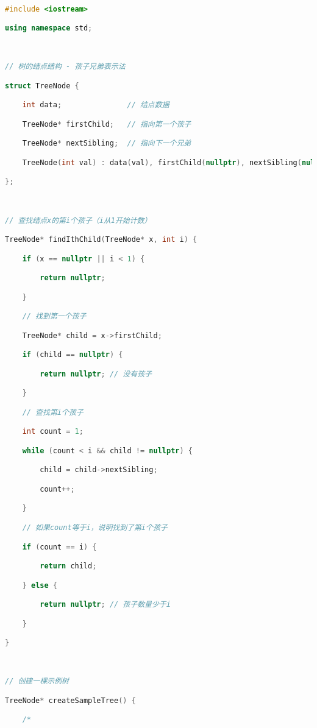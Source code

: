 \begin{lstlisting}[language=C++]

#include <iostream>

using namespace std;

  

// 树的结点结构 - 孩子兄弟表示法

struct TreeNode {

    int data;               // 结点数据

    TreeNode* firstChild;   // 指向第一个孩子

    TreeNode* nextSibling;  // 指向下一个兄弟

    TreeNode(int val) : data(val), firstChild(nullptr), nextSibling(nullptr) {}

};

  

// 查找结点x的第i个孩子（i从1开始计数）

TreeNode* findIthChild(TreeNode* x, int i) {

    if (x == nullptr || i < 1) {

        return nullptr;

    }

    // 找到第一个孩子

    TreeNode* child = x->firstChild;

    if (child == nullptr) {

        return nullptr; // 没有孩子

    }

    // 查找第i个孩子

    int count = 1;

    while (count < i && child != nullptr) {

        child = child->nextSibling;

        count++;

    }

    // 如果count等于i，说明找到了第i个孩子

    if (count == i) {

        return child;

    } else {

        return nullptr; // 孩子数量少于i

    }

}

  

// 创建一棵示例树

TreeNode* createSampleTree() {

    /*


\end{lstlisting}
